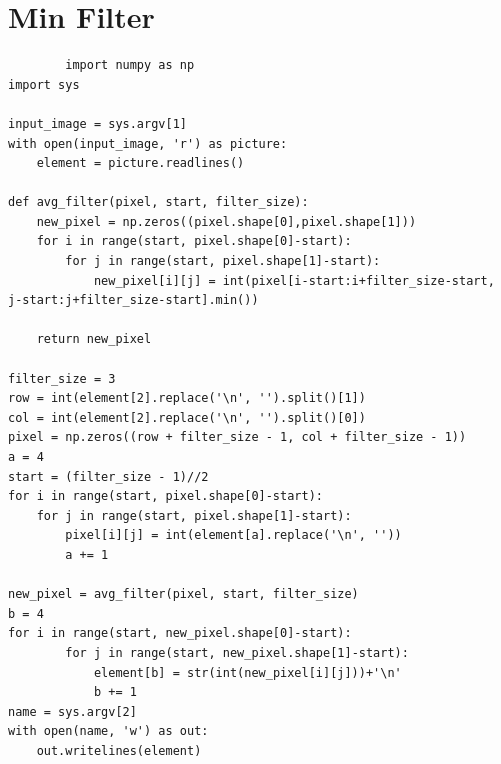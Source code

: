 \documentclass[a4paper,8pt]{article}
\begin{document}
        \section{Min Filter}
        \begin{verbatim}
        import numpy as np
import sys

input_image = sys.argv[1]
with open(input_image, 'r') as picture:
    element = picture.readlines()

def avg_filter(pixel, start, filter_size):
    new_pixel = np.zeros((pixel.shape[0],pixel.shape[1]))
    for i in range(start, pixel.shape[0]-start):
        for j in range(start, pixel.shape[1]-start):
            new_pixel[i][j] = int(pixel[i-start:i+filter_size-start, j-start:j+filter_size-start].min())

    return new_pixel

filter_size = 3
row = int(element[2].replace('\n', '').split()[1])
col = int(element[2].replace('\n', '').split()[0])
pixel = np.zeros((row + filter_size - 1, col + filter_size - 1))
a = 4
start = (filter_size - 1)//2
for i in range(start, pixel.shape[0]-start):
    for j in range(start, pixel.shape[1]-start):
        pixel[i][j] = int(element[a].replace('\n', ''))
        a += 1

new_pixel = avg_filter(pixel, start, filter_size)
b = 4
for i in range(start, new_pixel.shape[0]-start):
        for j in range(start, new_pixel.shape[1]-start):
            element[b] = str(int(new_pixel[i][j]))+'\n'
            b += 1
name = sys.argv[2]
with open(name, 'w') as out:
    out.writelines(element)

        \end{verbatim}
        
\end{document}
